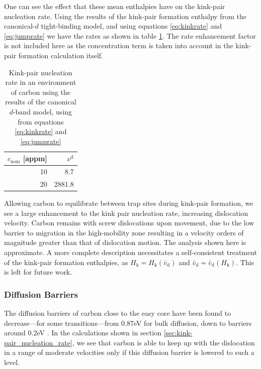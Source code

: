 \documentclass[a4paper,11pt]{article}
\numberwithin{equation}{chapter}
\numberwithin{listing}{chapter}
\begin{document}
One can see the effect that these mean enthalpies have on the kink-pair nucleation
rate. Using the results of the kink-pair formation enthalpy from the canonical-\(d\)
tight-binding model, and using equations \eqref{eq:kinkrate} and \eqref{eq:jumprate}
we have the rates as shown in table \ref{eqkinkrate}. The rate enhancement factor is not
included here as the concentration term is taken into account in the
kink-pair formation calculation itself.

\begin{table}[htbp]
\caption{Kink-pair nucleation rate in an environment of carbon using the results of the canonical \(d \text{-band}\) model, using from equations \eqref{eq:kinkrate} and \eqref{eq:jumprate} \label{eqkinkrate}}
\centering
\begin{tabular}{rr}
\toprule
\(c_{\text{nom}}\) [appm] & \(\nu^{\text{d}}\)\\
\midrule
10 & 8.7\\
20 & 2881.8\\
\bottomrule
\end{tabular}
\end{table}


Allowing carbon to equilibrate between trap sites during kink-pair formation, we see a
large enhancement to the kink pair nucleation rate, increasing dislocation
velocity. Carbon remains with screw dislocations upon movement, due to the low barrier
to migration in the high-mobility zone resulting in a velocity orders of magnitude
greater than that of dislocation motion. The analysis shown here is approximate. A
more complete description necessitates a self-consistent treatment of the kink-pair
formation enthalpies, as \(H_{\text{k}} = H_{\text{k}}(\bar{v}_{\text{d}})\) and
\(\bar{v}_{\text{d}} = \bar{v}_{\text{d}}(H_{\text{k}})\). This is left for future work.




\subsubsection{Diffusion Barriers}
\label{sec:orgdb4d727}

The diffusion barriers of carbon close to the easy core have been found to decrease---for some
transitions---from 0.87eV for bulk diffusion, down to barriers around 0.2eV
\cite{Nematollahi2016}. In the calculations shown in section \ref{sec:kink-pair_nucleation_rate}, we
see that carbon is able to keep up with the dislocation in a range of moderate velocities only if this
diffusion barrier is lowered to such a level.
\end{document}
